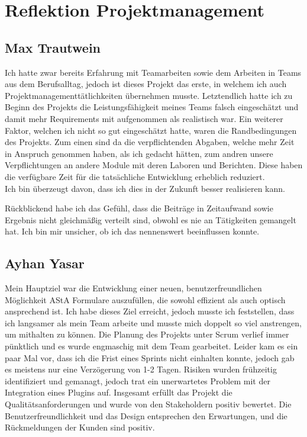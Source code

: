 \chapter{Reflektion Projektmanagement}\label{ch:reflektion-projektmanagement}


\section{Max Trautwein}

Ich hatte zwar bereits Erfahrung mit Teamarbeiten sowie dem Arbeiten in Teams aus dem Berufsalltag,
jedoch ist dieses Projekt das erste, in welchem ich auch Projektmanagementtätlichkeiten übernehmen musste.
Letztendlich hatte ich zu Beginn des Projekts die Leistungsfähigkeit meines Teams falsch eingeschätzt und
damit mehr Requirements mit aufgenommen als realistisch war.
Ein weiterer Faktor, welchen ich nicht so gut eingeschätzt hatte, waren die Randbedingungen des Projekts.
Zum einen sind da die verpflichtenden Abgaben, welche mehr Zeit in Anspruch genommen haben, als ich gedacht hätten,
zum andren unsere Verpflichtungen an andere Module mit deren Laboren und Berichten.
Diese haben die verfügbare Zeit für die tatsächliche Entwicklung erheblich reduziert.\\
Ich bin überzeugt davon, dass ich dies in der Zukunft besser realisieren kann.

Rückblickend habe ich das Gefühl, dass die Beiträge in Zeitaufwand sowie Ergebnis nicht gleichmäßig verteilt sind,
obwohl es nie an Tätigkeiten gemangelt hat.
Ich bin mir unsicher, ob ich das nennenswert beeinflussen konnte.

\section{Ayhan Yasar}
Mein Hauptziel war die Entwicklung einer neuen, benutzerfreundlichen Möglichkeit AStA Formulare auszufüllen, die sowohl effizient als auch optisch ansprechend ist. 
Ich habe dieses Ziel erreicht, jedoch musste ich feststellen, dass ich langsamer als mein Team arbeite und musste mich doppelt so viel anstrengen, um mithalten zu können.
Die Planung des Projekts unter Scrum verlief immer pünktlich und es wurde engmaschig mit dem Team gearbeitet. Leider kam es ein paar Mal vor, dass ich die Frist eines Sprints nicht einhalten konnte, 
jedoch gab es meistens nur eine Verzögerung von 1-2 Tagen. 
Risiken wurden frühzeitig identifiziert und gemanagt, jedoch trat ein unerwartetes Problem mit der Integration eines Plugins auf.
Insgesamt erfüllt das Projekt die Qualitätsanforderungen und wurde von den Stakeholdern positiv bewertet. Die Benutzerfreundlichkeit und das Design entsprechen den Erwartungen, und die Rückmeldungen der Kunden sind positiv.


